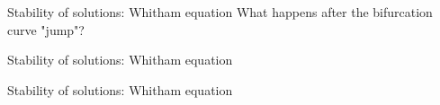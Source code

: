\begin{frame}[t]{Stability of solutions: Whitham equation}
What happens after the bifurcation curve "jump"?

\end{frame}
\begin{frame}[t]{Stability of solutions: Whitham equation}
\end{frame}
\begin{frame}[t]{Stability of solutions: Whitham equation}
\end{frame}
